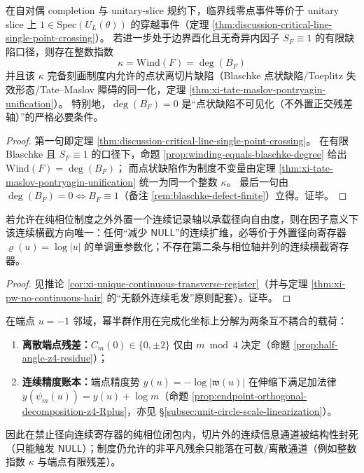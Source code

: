 \begin{theorem}\label{thm:discussion-crossing-winding-blaschke-index}
在自对偶 completion 与 unitary-slice 规约下，临界线零点事件等价于 unitary slice 上 \(1\in\mathrm{Spec}(U_L(\theta))\) 的穿越事件（定理 \ref{thm:discussion-critical-line-single-point-crossing}）。
若进一步处于边界酉化且无奇异内因子 \(S_F\equiv 1\) 的有限缺陷口径，则存在整数指数
\[
\boxed{\ \kappa=\mathrm{Wind}(F)=\deg(B_F)\ }
\]
并且该 \(\kappa\) 完备刻画制度内允许的点状离切片缺陷（Blaschke 点状缺陷/Toeplitz 失效形态/Tate--Maslov 障碍的同一化，定理 \ref{thm:xi-tate-maslov-pontryagin-unification}）。
特别地，\(\deg(B_F)=0\) 是“点状缺陷不可见化（不外置正交残差轴）”的严格必要条件。
\end{theorem}

\begin{proof}
第一句即定理 \ref{thm:discussion-critical-line-single-point-crossing}。
在有限 Blaschke 且 \(S_F\equiv 1\) 的口径下，命题 \ref{prop:winding-equals-blaschke-degree} 给出 \(\mathrm{Wind}(F)=\deg(B_F)\)；
而点状缺陷作为制度不变量由定理 \ref{thm:xi-tate-maslov-pontryagin-unification} 统一为同一个整数 \(\kappa\)。
最后一句由 \(\deg(B_F)=0\iff B_F\equiv 1\)（备注 \ref{rem:blaschke-defect-finite}）立得。证毕。
\end{proof}

\begin{theorem}\label{thm:discussion-unique-continuous-transversal}
若允许在纯相位制度之外外置一个连续记录轴以承载径向自由度，则在因子意义下该连续横截方向唯一：任何“减少 \(\mathsf{NULL}\)”的连续扩维，必等价于外置径向寄存器 \(\varrho(u)=\log|u|\) 的单调重参数化；不存在第二条与相位轴并列的连续横截寄存器。
\end{theorem}

\begin{proof}
见推论 \ref{cor:xi-unique-continuous-transverse-register}（并与定理 \ref{thm:xi-pw-no-continuous-hair} 的“无额外连续毛发”原则配套）。证毕。
\end{proof}

\begin{corollary}\label{cor:discussion-endpoint-discrete-vs-continuous}
在端点 \(u=-1\) 邻域，幂半群作用在完成化坐标上分解为两条互不耦合的载荷：
\begin{enumerate}
  \item \textbf{离散端点残差：}\(C_m(0)\in\{0,\pm 2\}\) 仅由 \(m\bmod 4\) 决定（命题 \ref{prop:half-angle-z4-residue}）；
  \item \textbf{连续精度账本：}端点精度势 \(y(u)=-\log|\mathfrak{w}(u)|\) 在伸缩下满足加法律 \(y(\psi_m(u))=y(u)+\log m\)（命题 \ref{prop:endpoint-orthogonal-decomposition-z4-Rplus}，亦见 \S\ref{subsec:unit-circle-scale-linearization}）。
\end{enumerate}
因此在禁止径向连续寄存器的纯相位闭包内，切片外的连续信息通道被结构性封死（只能触发 \(\mathsf{NULL}\)）；制度仍允许的非平凡残余只能落在可数/离散通道（例如整数指数 \(\kappa\) 与端点有限残差）。
\end{corollary}

